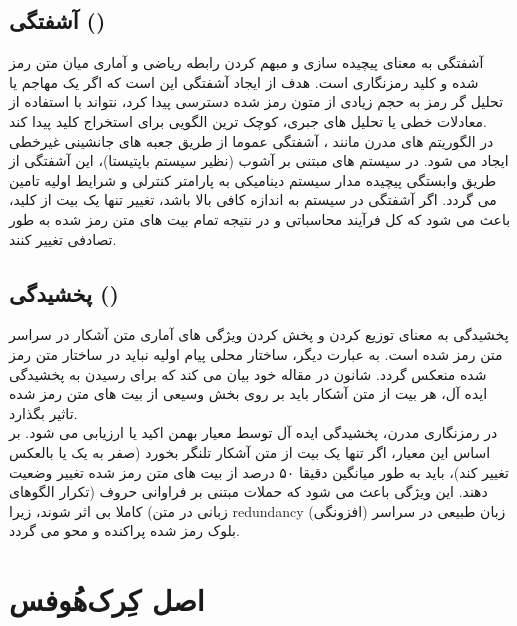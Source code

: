 \documentclass[12pt]{report}
\begin{document}
\subsection{آشفتگی ()}
\label{sec:confusion}
آشفتگی به معنای پیچیده سازی و مبهم کردن رابطه ریاضی و آماری میان متن رمز شده و کلید رمزنگاری است. 
هدف از ایجاد آشفتگی این است که اگر یک مهاجم یا تحلیل گر رمز به 
حجم زیادی از متون رمز شده دسترسی پیدا کرد، نتواند با استفاده از معادلات خطی یا تحلیل های جبری، 
کوچک ترین الگویی برای استخراج کلید پیدا کند. 
\\\noindent
در الگوریتم های مدرن مانند ، آشفتگی عموما از طریق جعبه های جانشینی 
غیرخطی ایجاد می شود. در سیستم های مبتنی بر آشوب (نظیر سیستم باپتیستا)، این آشفتگی از طریق 
وابستگی پیچیده مدار سیستم دینامیکی به پارامتر کنترلی و شرایط اولیه تامین می گردد. اگر آشفتگی در 
سیستم به اندازه کافی بالا باشد، تغییر تنها یک بیت از کلید، باعث می شود که کل فرآیند محاسباتی و در 
نتیجه تمام بیت های متن رمز شده به طور تصادفی تغییر کنند.

\subsection{پخشیدگی ()}
\label{sec:diffusion}
پخشیدگی به معنای توزیع کردن و پخش کردن ویژگی های آماری متن آشکار در سراسر متن رمز شده است. به 
عبارت دیگر، ساختار محلی پیام اولیه نباید در ساختار متن رمز شده منعکس گردد.
شانون
در مقاله خود
\cite{shannon-1949}
بیان می کند که 
برای رسیدن به پخشیدگی ایده آل، هر بیت از متن آشکار باید بر روی بخش وسیعی از بیت های متن رمز شده 
تاثیر بگذارد.
\\\noindent
در رمزنگاری مدرن، پخشیدگی ایده آل توسط معیار بهمن اکید 
یا  ارزیابی می شود. بر اساس این معیار، اگر تنها یک بیت از متن آشکار تلنگر بخورد (صفر به 
یک یا بالعکس تغییر کند)، باید به طور میانگین دقیقا ۵۰ درصد از بیت های متن رمز شده تغییر وضعیت دهند. 
این ویژگی باعث می شود که حملات مبتنی بر فراوانی حروف (تکرار الگوهای زبانی در متن) کاملا بی اثر 
شوند، زیرا redundancy (افزونگی) زبان طبیعی در سراسر بلوک رمز شده پراکنده و محو می گردد.

\newpage

\section[ اصل کِرک‌هُوفس - \lr{Kerckhoffs} ]{ اصل کِرک‌هُوفس}
\label{sec:kerckehoffs-principle}
\end{document}
